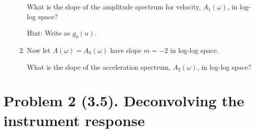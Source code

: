 \documentclass[11pt,titlepage,fleqn]{article}
\begin{document}
\begin{enumerate}
\begin{enumerate}
What is the slope of the amplitude spectrum for velocity, $A_1(\omega)$, in log-log space?

Hint: Write  as $g_0(u)$.

\item Now let $A(\omega) = A_0(\omega)$ have slope $m=-2$ in log-log space.

What is the slope of the acceleration spectrum, $A_2(\omega)$, in log-log space?

\end{enumerate}

\end{enumerate}


\pagebreak
\section*{Problem 2 (3.5). Deconvolving the instrument response}
\end{document}
